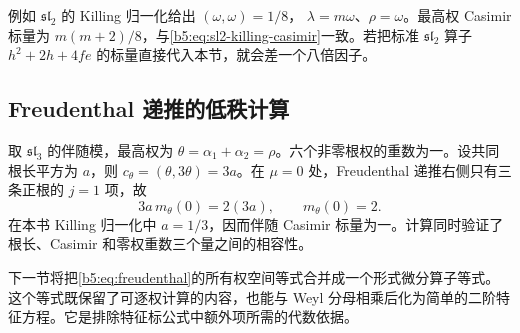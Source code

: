 \ProseParagraphBreak
例如 \(\mathfrak{sl}_2\) 的 Killing 归一化给出 \((\omega,\omega)=1/8\)， \(\lambda=m\omega\)、\(\rho=\omega\)。最高权 Casimir 标量为 \(m(m+2)/8\)，与\eqref{b5:eq:sl2-killing-casimir}一致。若把标准 \(\mathfrak{sl}_2\) 算子 \(h^2+2h+4fe\) 的标量直接代入本节，就会差一个八倍因子。

\subsection{Freudenthal 递推的低秩计算}
\label{b5:subsec:1902:04}

取 \(\mathfrak{sl}_3\) 的伴随模，最高权为 \(\theta=\alpha_1+\alpha_2=\rho\)。六个非零根权的重数为一。设共同根长平方为 \(a\)，则 \(c_\theta=(\theta,3\theta)=3a\)。在 \(\mu=0\) 处，Freudenthal 递推右侧只有三条正根的 \(j=1\) 项，故
\[
	3a\,m_\theta(0)=2(3a),\qquad m_\theta(0)=2.
\]
在本书 Killing 归一化中 \(a=1/3\)，因而伴随 Casimir 标量为一。计算同时验证了根长、Casimir 和零权重数三个量之间的相容性。

\ProseParagraphBreak
下一节将把\eqref{b5:eq:freudenthal}的所有权空间等式合并成一个形式微分算子等式。这个等式既保留了可逐权计算的内容，也能与 Weyl 分母相乘后化为简单的二阶特征方程。它是排除特征标公式中额外项所需的代数依据。
